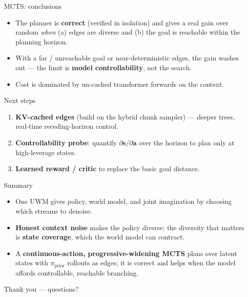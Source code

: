 \documentclass[aspectratio=169]{beamer}
\newcommand{\act}{\bm{a}}
\newcommand{\state}{\bm{s}}
\newcommand{\prior}{\pi_{\mathrm{prior}}}
\begin{document}
\begin{frame}{MCTS: conclusions}
  \begin{itemize}
    \item The planner is \textbf{correct} (verified in isolation) and gives a
      real gain over random \emph{when} (a) edges are diverse and (b) the goal
      is reachable within the planning horizon.
    \item With a far / unreachable goal or near-deterministic edges, the gain
      washes out --- the limit is \textbf{model controllability}, not the search.
    \item Cost is dominated by un-cached transformer forwards on the context.
  \end{itemize}
  \vspace{0.4em}
  \begin{block}{Next steps}
    \begin{enumerate}\small
      \item \textbf{KV-cached edges} (build on the hybrid chunk sampler) ---
        deeper trees, real-time receding-horizon control.
      \item \textbf{Controllability probe}: quantify $\partial\state/\partial\act$
        over the horizon to plan only at high-leverage states.
      \item \textbf{Learned reward / critic} to replace the basic goal distance.
    \end{enumerate}
  \end{block}
\end{frame}

\begin{frame}{Summary}
  \begin{itemize}
    \item One UWM gives policy, world model, and joint imagination by choosing
      which streams to denoise.
    \item \textbf{Honest context noise} makes the policy diverse; the diversity
      that matters is \textbf{state coverage}, which the world model can
      contract.
    \item A \textbf{continuous-action, progressive-widening MCTS} plans over
      latent states with $\prior$ rollouts as edges; it is correct and helps
      when the model affords controllable, reachable branching.
  \end{itemize}
  \vspace{0.8em}
  \centering\large Thank you --- questions?
\end{frame}
\end{document}
